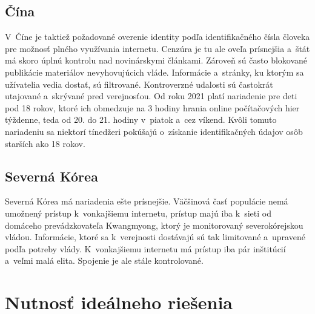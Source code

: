 \documentclass{article}
\begin{document}
\subsection{Čína}

V~Číne  je taktiež požadované overenie identity podľa identifikačného čísla človeka pre možnosť plného využívania internetu. Cenzúra  je tu ale oveľa prísnejšia a~štát má skoro úplnú kontrolu nad novinárskymi článkami. Zároveň sú často blokované publikácie materiálov nevyhovujúcich vláde. Informácie a~stránky, ku ktorým sa užívatelia vedia dostať, sú filtrované. Kontroverzné udalosti sú častokrát utajované a~skrývané pred verejnosťou. Od roku 2021 platí nariadenie pre deti pod 18 rokov, ktoré ich obmedzuje na 3 hodiny hrania online počítačových hier týždenne, teda od 20. do 21. hodiny v~piatok a~cez víkend. Kvôli tomuto nariadeniu sa niektorí tínedžeri pokúšajú o~získanie identifikačných údajov osôb starších ako 18 rokov.~\cite{wiki-china, china-game-limit}

\subsection{Severná Kórea}

Severná Kórea  má nariadenia ešte prísnejšie. Väčšinová časť populácie nemá umožnený prístup k~vonkajšiemu internetu, prístup majú iba k~sieti od domáceho prevádzkovateľa Kwangmyong, ktorý je monitorovaný severokórejskou vládou. Informácie, ktoré sa k~verejnosti dostávajú sú tak limitované a~upravené podľa potreby vlády.  K~vonkajšiemu internetu  má prístup iba pár inštitúcií a~veľmi malá elita. Spojenie je ale stále kontrolované.~\cite{wiki-nk-i, wiki-nk-c}

\section{Nutnosť ideálneho riešenia}
\end{document}
